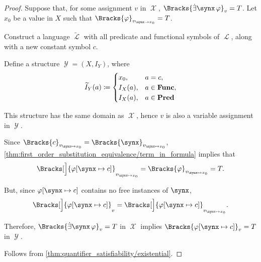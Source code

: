 \begin{proof}
  \SufficiencySubProof Suppose that, for some assignment \( v \) in \( \mscrX \), \( \Bracks{\qexists \synx \varphi}_v = T \). Let \( x_0 \) be a value in \( X \) such that \( \Bracks{\varphi}_{v_{\synx \to x_0}} = T \).

  Construct a language \( \widetilde \mscrL \) with all predicate and functional symbols of \( \mscrL \), along with a new constant symbol \( c \).

  Define a structure \( \mscrY = (X, I_Y) \), where
  \begin{equation*}
    \widetilde I_Y(a) \coloneqq \begin{cases}
      x_0,    &a = c, \\
      I_X(a), &a \in \op*{Func}, \\
      I_X(a), &a \in \op*{Pred}
    \end{cases}
  \end{equation*}

  This structure has the same domain as \( \mscrX \), hence \( v \) is also a variable assignment in \( \mscrY \).

  Since \( \Bracks{c}_{v_{\synx \mapsto x_0}} = \Bracks{\synx}_{v_{\synx \mapsto x_0}} \), \cref{thm:first_order_substitution_equivalence/term_in_formula} implies that
  \begin{equation*}
    \Bracks[\Big]{\varphi[\synx \mapsto c]}_{v_{\synx \mapsto x_0}} = \Bracks{\varphi}_{v_{\synx \mapsto x_0}} = T.
  \end{equation*}

  But, since \( \varphi[\synx \mapsto c] \) contains no free instances of \( \synx \),
  \begin{equation*}
    \Bracks[\Big]{\varphi[\synx \mapsto c]}_v = \Bracks[\Big]{\varphi[\synx \mapsto c]}_{v_{\synx \mapsto x_0}}.
  \end{equation*}

  Therefore, \( \Bracks{\qexists \synx \varphi}_v = T \) in \( \mscrX \) implies \( \Bracks{\varphi[\synx \mapsto c]}_v = T \) in \( \mscrY \).

  \NecessitySubProof Follows from \cref{thm:quantifier_satisfiability/existential}.
\end{proof}

